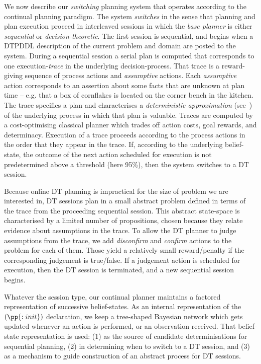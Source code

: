 
\newcommand{\entropy}{\ensuremath{\mathrm{H}}}


We now describe our {\em switching} planning system that operates
according to the continual planning paradigm. The system {\em
  switches} in the sense that planning and plan execution proceed in
interleaved sessions in which the {\em base planner} is either {\em
  sequential} or {\em decision-theoretic}.  The first session is
sequential, and begins when a DTPDDL description of the current
problem and domain are posted to the system.  During a sequential
session a serial plan is computed that corresponds to one
execution-{\em trace} in the underlying decision-process. That trace
is a reward-giving sequence of process actions and {\em assumptive}
actions. Each {\em assumptive} action corresponds to an assertion
about some facts that are unknown at plan time -- e.g. that a box of
cornflakes is located on the corner bench in the kitchen. The trace
specifies a plan and characterises a {\em deterministic approximation}
(see~\cite{yoon:etal:2008}) of the underlying process in which that
plan is valuable. Traces are computed by a cost-optimising classical
planner which trades off action costs, goal rewards, and
determinacy. Execution of a trace proceeds according to the process
actions in the order that they appear in the trace. If, according to
the underlying belief-state, the outcome of the next action scheduled
for execution is not predetermined above a threshold (here 95\%), then
the system switches to a DT session.




Because online DT planning is impractical for the size of problem we
are interested in, DT sessions plan in a small abstract problem
defined in terms of the trace from the proceeding sequential session.
This abstract state-space is characterised by a limited number of
propositions, chosen because they relate evidence about assumptions
in the trace.  To allow the DT planner to judge
assumptions from the trace, we add {\em disconfirm} and {\em confirm}
actions to the problem for each of them. Those yield a relatively
small reward/penalty if the corresponding judgement is true/false. If
a judgement action is scheduled for execution, then the DT session is
terminated, and a new sequential session begins.

Whatever the session type, our continual planner maintains a factored
representation of successive belief-states.  As an internal
representation of the $(\pp{:init})$ declaration, we keep a
tree-shaped Bayesian network which gets updated whenever an action is
performed, or an observation received. That belief-state
representation is used: (1) as the source of candidate
determinisations for sequential planning, (2) in determining when to
switch to a DT session, and (3) as a mechanism to guide construction
of an abstract process for DT sessions.

